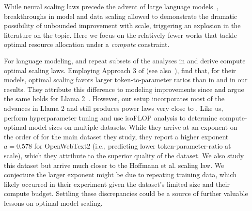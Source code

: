 \documentclass{article}
\makeatletter
\newcommand{\neurips}[1]{foo}
\newcommand{\workshop}[1]{baz}
\renewcommand{\neurips}[1]{\ignorespaces}%
\renewcommand{\workshop}[1]{\ignorespaces}%
\renewcommand{\neurips}[1]{\ignorespaces}%
\renewcommand{\workshop}[1]{#1}%
\renewcommand{\neurips}[1]{#1}%
\renewcommand{\workshop}[1]{\ignorespaces}%
\theoremstyle{plain}
\theoremstyle{definition}
\theoremstyle{remark}
\newcommand{\Hoffmann}{Hoffmann et al.\@\xspace}
\newcommand{\nExp}{a}
\makeatother
\begin{document}
\workshop{
    \section{Discussion}\label{sec:discussion}
    \subsection{Related work}\label{subsec:related_work}
}


\workshop{
    We refer to \Cref{app:related_work} for discussion of prior related work.
}

\neurips{
\workshop{
    \section{Prior related work}\label{app:related_work}
}
\neurips{}
While neural scaling laws precede the advent of large language models~\cite{hestness2017deep,rosenfeld2019constructive}, breakthroughs in model \cite{vaswani2017attention} and data \cite{radford2019language,raffel2020exploring} scaling allowed \citet{kaplan2020scaling} to demonstrate the dramatic possibility of unbounded improvement with scale, triggering an explosion in the literature on the topic. Here we focus on the relatively fewer works that tackle optimal resource allocation under a \emph{compute} constraint. 

For language modeling, \citet{hu2024minicpm} and \citet{deepseekai2024deepseek} repeat subsets of the analyses in \citet{hoffmann2022empirical} and derive compute optimal scaling laws. Employing Approach 3 of \citet{hoffmann2022empirical} (see also~\cite{besiroglu2024chinchilla}), \citet{hu2024minicpm} find that, for their models, optimal scaling favors larger token-to-parameter ratios than in \citet{hoffmann2022empirical} and in our results. They attribute this difference to modeling improvements since \cite{hoffmann2022empirical} and argue the same holds for Llama 2~\cite{touvron2023llama2}. However, our setup incorporates most of the advances in Llama 2 and still produces power laws very close to \citet{hoffmann2022empirical}. Like us, \citet{deepseekai2024deepseek} perform hyperparameter tuning and use isoFLOP analysis to determine compute-optimal model sizes on multiple datasets. While they arrive at an exponent on the order of \citet{hoffmann2022empirical} for the main dataset they study, they report a higher exponent $\nExp=0.578$ for OpenWebText2 (i.e., predicting lower token-parameter-ratio at scale), which they attribute to the superior quality of the dataset. We also study this dataset but arrive much closer to the \Hoffmann scaling law. We conjecture the larger exponent might be due to repeating training data, which likely occurred in their experiment given the dataset's limited size and their compute budget. Settling these discrepancies could be a source of further valuable lessons on optimal model scaling.

}
\end{document}

